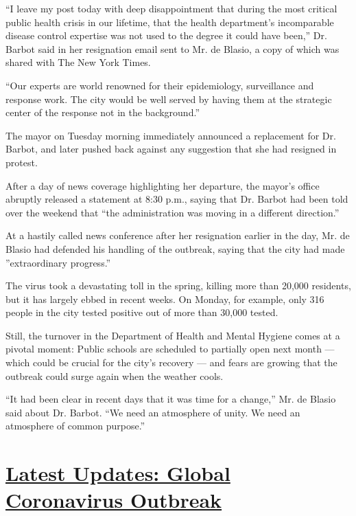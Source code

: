 ``I leave my post today with deep disappointment that during the most
critical public health crisis in our lifetime, that the health
department's incomparable disease control expertise was not used to the
degree it could have been,'' Dr. Barbot said in her resignation email
sent to Mr. de Blasio, a copy of which was shared with The New York
Times.

``Our experts are world renowned for their epidemiology, surveillance
and response work. The city would be well served by having them at the
strategic center of the response not in the background.''

The mayor on Tuesday morning immediately announced a replacement for Dr.
Barbot, and later pushed back against any suggestion that she had
resigned in protest.

After a day of news coverage highlighting her departure, the mayor's
office abruptly released a statement at 8:30 p.m., saying that Dr.
Barbot had been told over the weekend that ``the administration was
moving in a different direction.''

At a hastily called news conference after her resignation earlier in the
day, Mr. de Blasio had defended his handling of the outbreak, saying
that the city had made ''extraordinary progress.''

The virus took a devastating toll in the spring, killing more than
20,000 residents, but it has largely ebbed in recent weeks. On Monday,
for example, only 316 people in the city tested positive out of more
than 30,000 tested.

Still, the turnover in the Department of Health and Mental Hygiene comes
at a pivotal moment: Public schools are scheduled to partially open next
month --- which could be crucial for the city's recovery --- and fears
are growing that the outbreak could surge again when the weather cools.

``It had been clear in recent days that it was time for a change,'' Mr.
de Blasio said about Dr. Barbot. ``We need an atmosphere of unity. We
need an atmosphere of common purpose.''

\hypertarget{latest-updates-global-coronavirus-outbreak}{%
\section{\texorpdfstring{\href{https://www.nytimes.com/2020/08/04/world/coronavirus-cases.html?action=click\&pgtype=Article\&state=default\&region=MAIN_CONTENT_1\&context=storylines_live_updates}{Latest
Updates: Global Coronavirus
Outbreak}}{Latest Updates: Global Coronavirus Outbreak}}\label{latest-updates-global-coronavirus-outbreak}}

